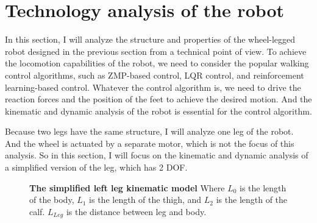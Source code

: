 \documentclass{article}
\begin{document}
\section*{Technology analysis of the robot}


In this section, I will analyze the structure and properties of the wheel-legged robot designed in the previous section from a technical point of view.
To achieve the locomotion capabilities of the robot, we need to consider the popular walking control algorithms, such as ZMP-based control, LQR control, and reinforcement learning-based control.
Whatever the control algorithm is, we need to drive the reaction forces and the position of the feet to achieve the desired motion. 
And the kinematic and dynamic analysis of the robot is essential for the control algorithm.

Because two legs have the same structure, I will analyze one leg of the robot. And the wheel is actuated by a separate motor, which is not the focus of this analysis.
So in this section, I will focus on the kinematic and dynamic analysis of a simplified version of the leg, which has 2 DOF.

\begin{figure}[h!]
  \centering
  \caption{\textbf{The simplified left leg kinematic model} Where $L_0$ is the length of the body, $L_1$ is the length of the thigh, 
          and $L_2$ is the length of the calf. $L_{Leg}$ is the distance between leg and body.}
    \label{fig:left-leg}
\end{figure}
\end{document}
